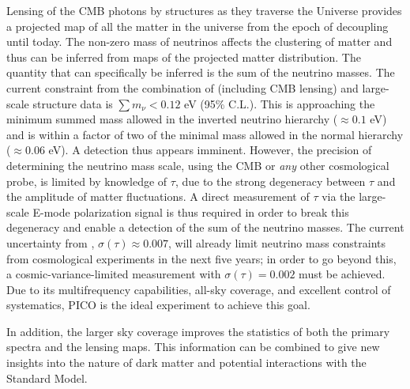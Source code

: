 \documentclass[PICOReport.tex]{subfiles}
\begin{document}
Lensing of the CMB photons by structures as they traverse the Universe provides a projected map of all the matter 
in the universe from the epoch of decoupling until today.  The non-zero mass of neutrinos affects the clustering of 
matter and thus can be inferred from maps of the projected matter distribution. The quantity that can specifically be 
inferred is the sum of the neutrino masses.  The current constraint from the combination of \planck (including CMB lensing) and large-scale structure data is $\sum m_{\nu} < 0.12$ eV (95\% C.L.).  This is approaching the minimum summed mass allowed in the inverted neutrino hierarchy ($\approx 0.1$ eV) and is within a factor of two of the minimal mass allowed in the normal hierarchy ($\approx 0.06$ eV).  A detection thus appears imminent.  %
However, the precision of determining the neutrino mass scale, using the CMB or {\it any} other cosmological probe, is limited by knowledge of $\tau$, due to the strong degeneracy between $\tau$ and the amplitude of matter fluctuations.  %
A direct measurement of $\tau$ via the large-scale E-mode polarization signal is thus required in order to break this degeneracy and enable a detection of the sum of the neutrino masses.  The current uncertainty from \planck, $\sigma(\tau) \approx 0.007$, will already limit neutrino mass constraints from cosmological experiments in the next five years; in order to go beyond this, a 
cosmic-variance-limited measurement with $\sigma(\tau) = 0.002$ must be achieved.  Due to its multifrequency capabilities, all-sky coverage, and excellent control of systematics, PICO is the ideal experiment to achieve this goal.

In addition, the larger sky coverage improves the statistics of both the primary spectra and the lensing maps.  
This information can be combined to give new insights into the nature of dark matter and potential interactions 
with the Standard Model. 
\end{document}
